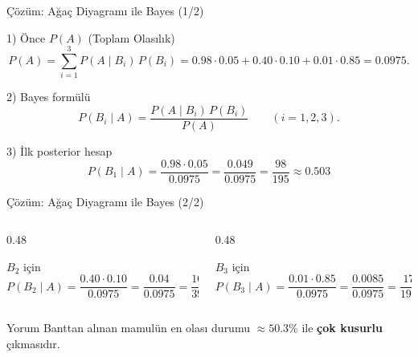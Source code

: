 \documentclass[light]{lutbeamer}
\begin{document}

\begin{frame}{Çözüm: Ağaç Diyagramı ile Bayes (1/2)}
\small

\begin{block}{1) Önce $P(A)$ (Toplam Olasılık)}
\begin{equation}
\label{eq:PA_tree}
P(A)=\sum_{i=1}^3 P(A\mid B_i)\,P(B_i)
=0.98\cdot 0.05 + 0.40\cdot 0.10 + 0.01\cdot 0.85
=0.0975.
\end{equation}
\end{block}

\begin{alertblock}{2) Bayes formülü}
\begin{equation}
\label{eq:posterior_tree}
P(B_i\mid A)=\frac{P(A\mid B_i)\,P(B_i)}{P(A)} \qquad (i=1,2,3).
\end{equation}
\end{alertblock}

\begin{block}{3) İlk posterior hesap}
\[
P(B_1\mid A)=\frac{0.98\cdot 0.05}{0.0975}
=\frac{0.049}{0.0975}
=\frac{98}{195}\approx 0.503
\]
\end{block}

\end{frame}

\begin{frame}{Çözüm: Ağaç Diyagramı ile Bayes (2/2)}
\small

\begin{columns}[T]
\begin{column}{0.48\textwidth}
\begin{block}{$B_2$ için}
\[
P(B_2\mid A)=\frac{0.40\cdot 0.10}{0.0975}
=\frac{0.04}{0.0975}
=\frac{16}{39}\approx 0.410
\]
\end{block}
\end{column}

\begin{column}{0.48\textwidth}
\begin{block}{$B_3$ için}
\[
P(B_3\mid A)=\frac{0.01\cdot 0.85}{0.0975}
=\frac{0.0085}{0.0975}
=\frac{17}{195}\approx 0.087
\]
\end{block}
\end{column}
\end{columns}

\begin{alertblock}{Yorum}
Banttan alınan mamulün en olası durumu
\(\approx 50.3\%\) ile \textbf{çok kusurlu} çıkmasıdır.
\end{alertblock}

\end{frame}
\end{document}
